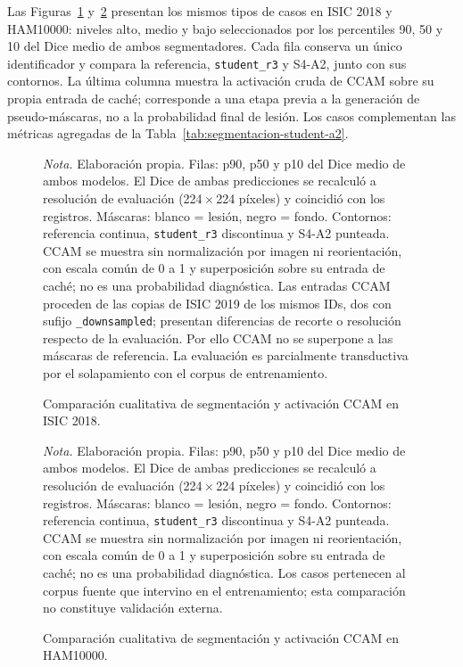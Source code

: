Las Figuras~\ref{fig:segmentacion-ejemplos} y~\ref{fig:segmentacion-ham-completa} presentan los mismos tipos de casos en ISIC 2018 y HAM10000: niveles alto, medio y bajo seleccionados por los percentiles 90, 50 y 10 del Dice medio de ambos segmentadores. Cada fila conserva un único identificador y compara la referencia, \texttt{student\_r3} y S4-A2, junto con sus contornos. La última columna muestra la activación cruda de CCAM sobre su propia entrada de caché; corresponde a una etapa previa a la generación de pseudo-máscaras, no a la probabilidad final de lesión. Los casos complementan las métricas agregadas de la Tabla~\ref{tab:segmentacion-student-a2}.

\begin{figure}[!htbp]
\caption{Comparación cualitativa de segmentación y activación CCAM en ISIC 2018.}
\label{fig:segmentacion-ejemplos}
\centering
\noindent\makebox[\linewidth][c]{}
\par\smallskip
{\singlespacing\fontsize{11}{13}\selectfont\raggedright
\noindent\textit{Nota.} Elaboración propia. Filas: p90, p50 y p10 del Dice medio de ambos modelos. El Dice de ambas predicciones se recalculó a resolución de evaluación (224\,\(\times\)\,224 píxeles) y coincidió con los registros. Máscaras: blanco = lesión, negro = fondo. Contornos: referencia continua, \texttt{student\_r3} discontinua y S4-A2 punteada. CCAM se muestra sin normalización por imagen ni reorientación, con escala común de 0 a 1 y superposición sobre su entrada de caché; no es una probabilidad diagnóstica. Las entradas CCAM proceden de las copias de ISIC 2019 de los mismos IDs, dos con sufijo \texttt{\_downsampled}; presentan diferencias de recorte o resolución respecto de la evaluación. Por ello CCAM no se superpone a las máscaras de referencia. La evaluación es parcialmente transductiva por el solapamiento con el corpus de entrenamiento.\par}
\end{figure}

\begin{figure}[!htbp]
\caption{Comparación cualitativa de segmentación y activación CCAM en HAM10000.}
\label{fig:segmentacion-ham-completa}
\centering
\noindent\makebox[\linewidth][c]{}
\par\smallskip
{\singlespacing\fontsize{11}{13}\selectfont\raggedright
\noindent\textit{Nota.} Elaboración propia. Filas: p90, p50 y p10 del Dice medio de ambos modelos. El Dice de ambas predicciones se recalculó a resolución de evaluación (224\,\(\times\)\,224 píxeles) y coincidió con los registros. Máscaras: blanco = lesión, negro = fondo. Contornos: referencia continua, \texttt{student\_r3} discontinua y S4-A2 punteada. CCAM se muestra sin normalización por imagen ni reorientación, con escala común de 0 a 1 y superposición sobre su entrada de caché; no es una probabilidad diagnóstica. Los casos pertenecen al corpus fuente que intervino en el entrenamiento; esta comparación no constituye validación externa.\par}
\end{figure}




